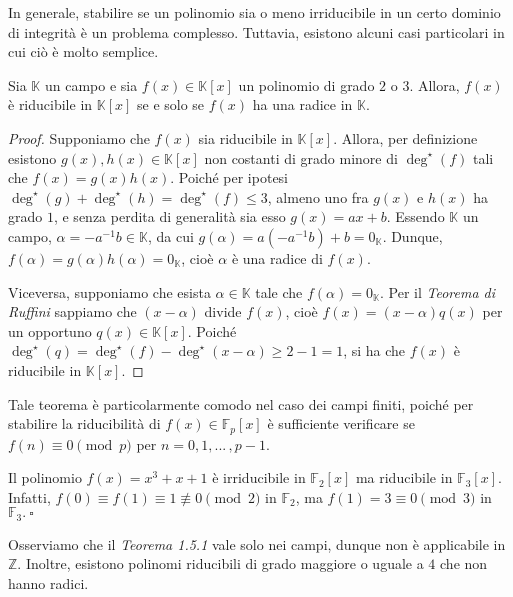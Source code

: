 \noindent In generale, stabilire se un polinomio sia o meno irriducibile in un certo dominio di integrità è un problema complesso. Tuttavia, esistono alcuni casi particolari in cui ciò è molto semplice.

\begin{teo}{}
Sia $\mathbb{K}$ un campo e sia $f(x)\in \mathbb{K}[x]$ un polinomio di grado $2$ o $3$. Allora, $f(x)$ è riducibile in $\mathbb{K}[x]$ se e solo se $f(x)$ ha una radice in $\mathbb{K}$.
\end{teo}
\vspace{-4mm}
\begin{proof}
Supponiamo che $f(x)$ sia riducibile in $\mathbb{K}[x]$. Allora, per definizione esistono $g(x),h(x)\in \mathbb{K}[x]$ non costanti di grado minore di $\deg^{\star}(f)$ tali che $f(x)=g(x)h(x)$. Poiché per ipotesi $\deg^{\star}(g)+\deg^{\star}(h)=\deg^{\star}(f)\leq 3$, almeno uno fra $g(x)$ e $h(x)$ ha grado $1$, e senza perdita di generalità sia esso $g(x)=ax+b$. Essendo $\mathbb{K}$ un campo, $\alpha=-a^{-1}b\in \mathbb{K}$, da cui $g(\alpha)=a(-a^{-1}b)+b=0_{\mathbb{K}}$. Dunque, $f(\alpha)=g(\alpha)h(\alpha)=0_{\mathbb{K}}$, cioè $\alpha$ è una radice di $f(x)$.

Viceversa, supponiamo che esista $\alpha\in \mathbb{K}$ tale che $f(\alpha)=0_{\mathbb{K}}$. Per il \emph{Teorema di Ruffini} sappiamo che $(x-\alpha)$ divide $f(x)$, cioè $f(x)=(x-\alpha)q(x)$ per un opportuno $q(x)\in \mathbb{K}[x]$. Poiché $\deg^{\star}(q)=\deg^{\star}(f)-\deg^{\star}(x-\alpha)\geq 2-1=1$, si ha che $f(x)$ è riducibile in $\mathbb{K}[x]$.
\end{proof}

\noindent Tale teorema è particolarmente comodo nel caso dei campi finiti, poiché per stabilire la riducibilità di $f(x)\in \mathbb{F}_p[x]$ è sufficiente verificare se $f(n)\equiv 0\pmod{p}$ per $n=0,1,...\,,p-1$.

\begin{exm}Il polinomio $f(x)=x^3+x+1$ è irriducibile in $\mathbb{F}_2[x]$ ma riducibile in $\mathbb{F}_3[x]$. Infatti, $f(0)\equiv f(1)\equiv 1\not\equiv 0\pmod{2}$ in $\mathbb{F}_2$, ma $f(1)=3\equiv 0\pmod{3}$ in $\mathbb{F}_3. \ \square$\end{exm} 

\noindent Osserviamo che il \emph{Teorema 1.5.1} vale solo nei campi, dunque non è applicabile in $\mathbb{Z}$. Inoltre, esistono polinomi riducibili di grado maggiore o uguale a $4$ che non hanno radici.

